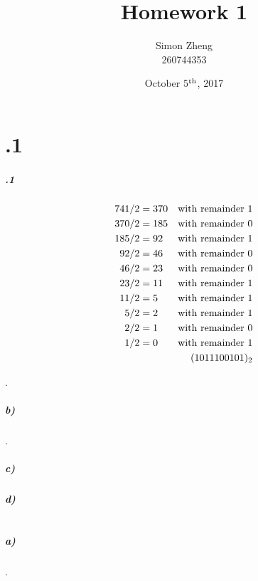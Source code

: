 \documentclass[11pt,letterpaper]{article}
\author{Simon Zheng\\260744353}
\title{Homework 1}
\date{October 5$^{\textnormal{th}}$, 2017}
\begin{document}
	\maketitle
	\thispagestyle{fancy}
	
	\section{.1}
	
		\subparagraph{.1}
		\begin{align*}
		741 / 2 &= 370&\textnormal{with remainder 1}\\
		370 / 2 &= 185&\textnormal{with remainder 0}\\
		185 / 2 &=  92&\textnormal{with remainder 1}\\
		 92 / 2 &=  46&\textnormal{with remainder 0}\\
		 46 / 2 &=  23&\textnormal{with remainder 0}\\
		 23 / 2 &=  11&\textnormal{with remainder 1}\\
		 11 / 2 &=   5&\textnormal{with remainder 1}\\
		  5 / 2 &=   2&\textnormal{with remainder 1}\\
		  2 / 2 &=   1&\textnormal{with remainder 0}\\
		  1 / 2 &=   0&\textnormal{with remainder 1}\\
		&&(1011100101)_2
		\end{align*}
        
    	.
		
		\subparagraph{b)}
		.
		
		\subparagraph{c)}
		\begin{center}
		
		\end{center}
		
		
		\subparagraph{d)}
		
		
	\section{}
	
		\subparagraph{a)}
		.
		
\end{document}
